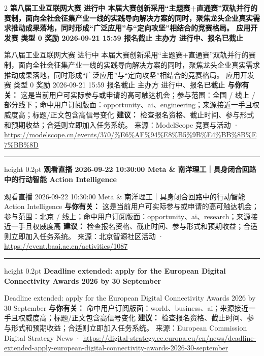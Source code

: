 \documentclass[10.5pt]{ctexart}
\begin{document}
\begin{multicols}{2}
{\large\bfseries 第八届工业互联网大赛 进行中 本届大赛创新采用“主题赛+直通赛”双轨并行的赛制，面向全社会征集产业一线的实践导向解决方案的同时，聚焦龙头企业真实需求推动成果落地，同时形成“广泛应用”与“定向攻坚”相结合的竞赛格局。 应用开发赛 类型 0 奖励 2026-09-21 15:59 报名截止 主办方 进行中、报名已截止}\par
第八届工业互联网大赛 进行中 本届大赛创新采用“主题赛+直通赛”双轨并行的赛制，面向全社会征集产业一线的实践导向解决方案的同时，聚焦龙头企业真实需求推动成果落地，同时形成“广泛应用”与“定向攻坚”相结合的竞赛格局。 应用开发赛 类型 0 奖励 2026-09-21 15:59 报名截止 主办方 进行中、报名已截止
\textbf{与你有关：} 这是当前用户可实际参与或申请的高可触达机会；参与范围：全国 / 线上 / 部分线下；命中用户订阅版面：opportunity、ai、engineering；来源接近一手且权威度高；标题/正文包含高信号变化
\textbf{建议：} 检查报名资格、截止时间、参与形式和预期收益；合适则立即加入任务系统。
{\footnotesize\color{ormuted} 来源：ModelScope 竞赛与活动 · \url{https://modelscope.cn/events/370/%E6%AF%94%E8%B5%9B%E4%BB%8B%E7%BB%8D}}
\vspace{2mm}
\hrule height 0.2pt
\vspace{2mm}
{\large\bfseries 观看直播 2026-09-22 10:30:00 Meta \& 南洋理工｜具身闭合回路中的行动智能 Action Intelligence}\par
观看直播 2026-09-22 10:30:00 Meta \& 南洋理工｜具身闭合回路中的行动智能 Action Intelligence
\textbf{与你有关：} 这是当前用户可实际参与或申请的高可触达机会；参与范围：北京 / 线上；命中用户订阅版面：opportunity、ai、research；来源接近一手且权威度高
\textbf{建议：} 检查报名资格、截止时间、参与形式和预期收益；合适则立即加入任务系统。
{\footnotesize\color{ormuted} 来源：北京智源社区活动 · \url{https://event.baai.ac.cn/activities/1087}}
\vspace{2mm}
\hrule height 0.2pt
\vspace{2mm}
{\large\bfseries Deadline extended: apply for the European Digital Connectivity Awards 2026 by 30 September}\par
Deadline extended: apply for the European Digital Connectivity Awards 2026 by 30 September
\textbf{与你有关：} 命中用户订阅版面：world、business、ai；来源接近一手且权威度高；标题/正文包含高信号变化
\textbf{建议：} 检查报名资格、截止时间、参与形式和预期收益；合适则立即加入任务系统。
{\footnotesize\color{ormuted} 来源：European Commission Digital Strategy News · \url{https://digital-strategy.ec.europa.eu/en/news/deadline-extended-apply-european-digital-connectivity-awards-2026-30-september}}
\vspace{2mm}

\end{multicols}
\end{document}
